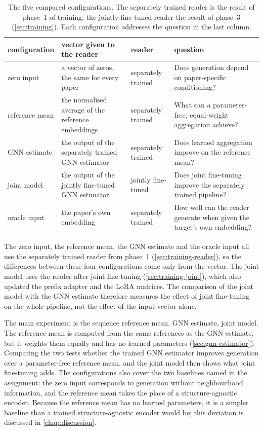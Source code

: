 \begin{table}[!ht]
  \centering
  \small
  \begin{tabular}{@{}p{2.3cm}p{3.6cm}p{2.2cm}p{5.0cm}@{}}
    \toprule
    \raggedright configuration & \raggedright vector given to the reader & \raggedright reader & \raggedright question \tabularnewline
    \midrule
    \raggedright zero input & \raggedright a vector of zeros, the same for every paper & \raggedright separately trained & \raggedright Does generation depend on paper-specific conditioning? \tabularnewline
    \raggedright reference mean & \raggedright the normalised average of the reference embeddings & \raggedright separately trained & \raggedright What can a parameter-free, equal-weight aggregation achieve? \tabularnewline
    \raggedright GNN estimate & \raggedright the output of the separately trained GNN estimator & \raggedright separately trained & \raggedright Does learned aggregation improve on the reference mean? \tabularnewline
    \raggedright joint model & \raggedright the output of the jointly fine-tuned GNN estimator & \raggedright jointly fine-tuned & \raggedright Does joint fine-tuning improve the separately trained pipeline? \tabularnewline
    \raggedright oracle input & \raggedright the paper's own embedding & \raggedright separately trained & \raggedright How well can the reader generate when given the target's own embedding? \tabularnewline
    \bottomrule
  \end{tabular}
  \caption{The five compared configurations. The separately trained reader is the result of phase~1 of training, the jointly fine-tuned reader the result of phase~3 (\autoref{sec:training}). Each configuration addresses the question in the last column.}
  \label{tab:configurations}
\end{table}

The zero input, the reference mean, the GNN estimate and the oracle input all use the separately trained reader from phase~1 (\autoref{sec:training-reader}), so the differences between these four configurations come only from the vector. The joint model uses the reader after joint fine-tuning (\autoref{sec:training-joint}), which also updated the prefix adapter and the LoRA matrices. The comparison of the joint model with the GNN estimate therefore measures the effect of joint fine-tuning on the whole pipeline, not the effect of the input vector alone.

The main experiment is the sequence reference mean, GNN estimate, joint model. The reference mean is computed from the same references as the GNN estimate, but it weights them equally and has no learned parameters (\autoref{sec:gnn-estimator}). Comparing the two tests whether the trained GNN estimator improves generation over a parameter-free reference mean, and the joint model then shows what joint fine-tuning adds. The configurations also cover the two baselines named in the assignment: the zero input corresponds to generation without neighbourhood information, and the reference mean takes the place of a structure-agnostic encoder. Because the reference mean has no learned parameters, it is a simpler baseline than a trained structure-agnostic encoder would be; this deviation is discussed in \autoref{chap:discussion}.

